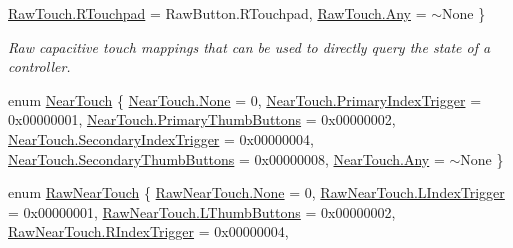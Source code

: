 \begin{DoxyCompactItemize}
\newline
\mbox{\hyperlink{class_o_v_r_input_a6e130faa2035c5b20853c1177d909cc6a589550297d0b2ddda9f8bc62fcb2060e}{Raw\+Touch.\+R\+Touchpad}} = Raw\+Button.\+R\+Touchpad, 
\mbox{\hyperlink{class_o_v_r_input_a6e130faa2035c5b20853c1177d909cc6aed36a1ef76a59ee3f15180e0441188ad}{Raw\+Touch.\+Any}} = $\sim$\+None
 \}
\begin{DoxyCompactList}\small\item\em Raw capacitive touch mappings that can be used to directly query the state of a controller. \end{DoxyCompactList}\item 
enum \mbox{\hyperlink{class_o_v_r_input_afa31aa573064be9bab8fc9e58cddeab6}{Near\+Touch}} \{ \newline
\mbox{\hyperlink{class_o_v_r_input_afa31aa573064be9bab8fc9e58cddeab6a6adf97f83acf6453d4a6a4b1070f3754}{Near\+Touch.\+None}} = 0, 
\mbox{\hyperlink{class_o_v_r_input_afa31aa573064be9bab8fc9e58cddeab6a05ce3346fd067f05de712c153423a543}{Near\+Touch.\+Primary\+Index\+Trigger}} = 0x00000001, 
\mbox{\hyperlink{class_o_v_r_input_afa31aa573064be9bab8fc9e58cddeab6a85205b778ef8021ee14805c3a36c67a1}{Near\+Touch.\+Primary\+Thumb\+Buttons}} = 0x00000002, 
\mbox{\hyperlink{class_o_v_r_input_afa31aa573064be9bab8fc9e58cddeab6a8e997b6d1a9db4d4084bdb67c3701b01}{Near\+Touch.\+Secondary\+Index\+Trigger}} = 0x00000004, 
\newline
\mbox{\hyperlink{class_o_v_r_input_afa31aa573064be9bab8fc9e58cddeab6acfec5e25ea7af4398e8618195c792ec3}{Near\+Touch.\+Secondary\+Thumb\+Buttons}} = 0x00000008, 
\mbox{\hyperlink{class_o_v_r_input_afa31aa573064be9bab8fc9e58cddeab6aed36a1ef76a59ee3f15180e0441188ad}{Near\+Touch.\+Any}} = $\sim$\+None
 \}
\item 
enum \mbox{\hyperlink{class_o_v_r_input_ac9c3c10aa9911507c6dc66e2dd6ec60e}{Raw\+Near\+Touch}} \{ \newline
\mbox{\hyperlink{class_o_v_r_input_ac9c3c10aa9911507c6dc66e2dd6ec60ea6adf97f83acf6453d4a6a4b1070f3754}{Raw\+Near\+Touch.\+None}} = 0, 
\mbox{\hyperlink{class_o_v_r_input_ac9c3c10aa9911507c6dc66e2dd6ec60ea539fc444c6c42c09fec1c86daa96b8a2}{Raw\+Near\+Touch.\+L\+Index\+Trigger}} = 0x00000001, 
\mbox{\hyperlink{class_o_v_r_input_ac9c3c10aa9911507c6dc66e2dd6ec60ea4fa5a033fe18dd12447d7305efc90e91}{Raw\+Near\+Touch.\+L\+Thumb\+Buttons}} = 0x00000002, 
\mbox{\hyperlink{class_o_v_r_input_ac9c3c10aa9911507c6dc66e2dd6ec60ea0501589371e70c45f36658f9bb4b7843}{Raw\+Near\+Touch.\+R\+Index\+Trigger}} = 0x00000004, 
\newline

\end{DoxyCompactItemize}

